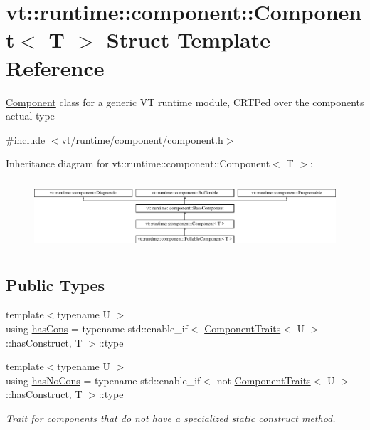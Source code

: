 \hypertarget{structvt_1_1runtime_1_1component_1_1_component}{}\section{vt\+:\+:runtime\+:\+:component\+:\+:Component$<$ T $>$ Struct Template Reference}
\label{structvt_1_1runtime_1_1component_1_1_component}


{\ttfamily \hyperlink{structvt_1_1runtime_1_1component_1_1_component}{Component}} class for a generic VT runtime module, C\+R\+TP\textquotesingle{}ed over the component\textquotesingle{}s actual type  




{\ttfamily \#include $<$vt/runtime/component/component.\+h$>$}

Inheritance diagram for vt\+:\+:runtime\+:\+:component\+:\+:Component$<$ T $>$\+:\begin{figure}[H]
\begin{center}
\leavevmode
\includegraphics[height=2.583622cm]{structvt_1_1runtime_1_1component_1_1_component}
\end{center}
\end{figure}
\subsection*{Public Types}
\begin{DoxyCompactItemize}
\item 
{\footnotesize template$<$typename U $>$ }\\using \hyperlink{structvt_1_1runtime_1_1component_1_1_component_aca5f3a7c1db697b6d0ba70de7ff8b887}{has\+Cons} = typename std\+::enable\+\_\+if$<$ \hyperlink{structvt_1_1runtime_1_1component_1_1_component_traits}{Component\+Traits}$<$ U $>$\+::has\+Construct, T $>$\+::type
\item 
{\footnotesize template$<$typename U $>$ }\\using \hyperlink{structvt_1_1runtime_1_1component_1_1_component_a389e53dbfc20013d66ef09d4f42c0a53}{has\+No\+Cons} = typename std\+::enable\+\_\+if$<$ not \hyperlink{structvt_1_1runtime_1_1component_1_1_component_traits}{Component\+Traits}$<$ U $>$\+::has\+Construct, T $>$\+::type
\begin{DoxyCompactList}\small\item\em Trait for components that do not have a specialized static construct method. \end{DoxyCompactList}\end{DoxyCompactItemize}
